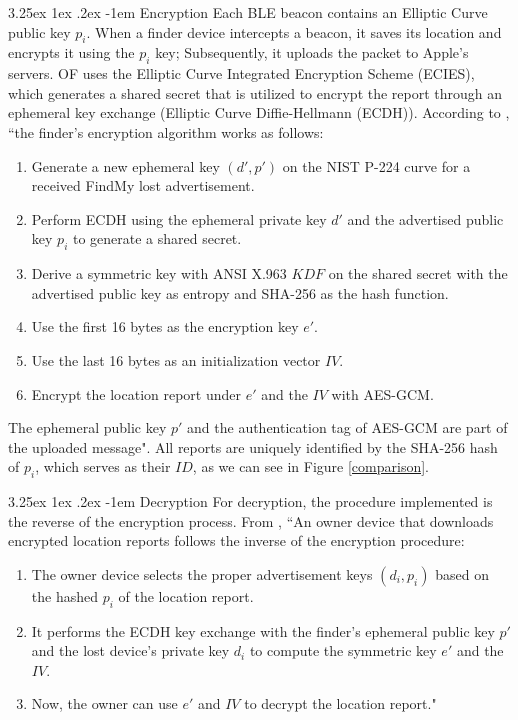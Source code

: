\documentclass[english]{article}
\makeatletter
\renewcommand\paragraph{\@startsection{paragraph}{5}{\z@}%
  {3.25ex \@plus1ex \@minus.2ex}%
  {-1em}%
  {\normalfont\normalsize\bfseries}}
\makeatother
\begin{document}
\paragraph{Encryption}
Each BLE beacon contains an Elliptic Curve public key $p_i$. When a finder device intercepts a beacon, it saves its location and encrypts it using the $p_i$ key; Subsequently, it uploads the packet to Apple's servers.
OF uses the Elliptic Curve Integrated Encryption Scheme (ECIES), which generates a shared secret that is utilized to encrypt the report through an ephemeral key exchange (Elliptic Curve Diffie-Hellmann (ECDH)). According to \cite{whocanfind}, ``the finder’s encryption algorithm works as follows:
\begin{enumerate}
  \item Generate a new ephemeral key $(d', p')$ on the NIST P-224 curve for a received FindMy lost advertisement.
  \item Perform ECDH using the ephemeral private key $d'$ and the advertised public key $p_i$ to generate a shared secret.
  \item Derive a symmetric key with ANSI X.963 $KDF$ on the shared secret with the advertised public key as entropy and SHA-256 as the hash function.
  \item Use the first 16 bytes as the encryption key $e'$.
  \item Use the last 16 bytes as an initialization vector $IV$.
  \item Encrypt the location report under $e'$ and the $IV$ with AES-GCM. 
\end{enumerate} 
The ephemeral public key $p'$ and the authentication tag of AES-GCM are part of the uploaded message". 
All reports are uniquely identified by the SHA-256 hash of $p_i$, which serves as their $ID$, as we can see in Figure \ref{comparison}.

\paragraph{Decryption}
For decryption, the procedure implemented is the reverse of the encryption process. From \cite{whocanfind}, ``An owner device that downloads encrypted location reports follows the inverse of the encryption procedure:
\begin{enumerate}
  \item The owner device selects the proper advertisement keys $(d_i, p_i)$ based on the hashed $p_i$ of the location report.
  \item It performs the ECDH key exchange with the finder’s ephemeral public key $p'$ and the lost device’s private key $d_i$ to compute the symmetric key $e'$ and the $IV$.
  \item Now, the owner can use $e'$ and $IV$ to decrypt the location report."
\end{enumerate}
\end{document}
